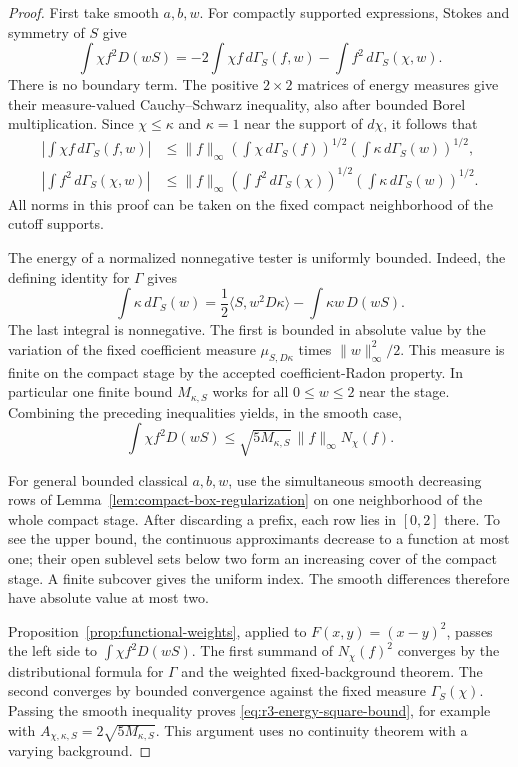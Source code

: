 \documentclass[11pt,a4paper]{article}
\numberwithin{equation}{section}
\theoremstyle{definition}
\theoremstyle{remark}
\begin{document}
\begin{proof}
First take smooth $a,b,w$. For compactly supported expressions,
Stokes and symmetry of $S$ give
\begin{equation}
\label{eq:r3-square-green}
 \int\chi f^2D(wS)
    =-2\int\chi f\,d\Gamma_S(f,w)
       -\int f^2\,d\Gamma_S(\chi,w).
\end{equation}
There is no boundary term. The positive $2\times2$ matrices of
energy measures give their measure-valued Cauchy--Schwarz
inequality, also after bounded Borel multiplication. Since
$\chi\leq\kappa$ and $\kappa=1$ near the support of
$d\chi$, it follows that
\begin{align*}
 \left|\int\chi f\,d\Gamma_S(f,w)\right|
   &\leq \|f\|_\infty
       \left(\int\chi\,d\Gamma_S(f)\right)^{1/2}
       \left(\int\kappa\,d\Gamma_S(w)\right)^{1/2},\\
 \left|\int f^2\,d\Gamma_S(\chi,w)\right|
   &\leq \|f\|_\infty
       \left(\int f^2\,d\Gamma_S(\chi)\right)^{1/2}
       \left(\int\kappa\,d\Gamma_S(w)\right)^{1/2}.
\end{align*}
All norms in this proof can be taken on the fixed compact
neighborhood of the cutoff supports.

The energy of a normalized nonnegative tester is uniformly bounded.
Indeed, the defining identity for $\Gamma$ gives
\[
 \int\kappa\,d\Gamma_S(w)
  =\frac12\langle S,w^2D\kappa\rangle
       -\int\kappa w\,D(wS).
\]
The last integral is nonnegative. The first is bounded in absolute
value by the variation of the fixed coefficient measure
$\mu_{S,D\kappa}$ times $\|w\|_\infty^2/2$.
This measure is finite on the compact stage by the accepted
coefficient-Radon property. In particular one finite bound
$M_{\kappa,S}$ works for all $0\leq w\leq2$ near the stage.
Combining the preceding inequalities yields, in the smooth case,
\[
 \int\chi f^2D(wS)
 \leq \sqrt{5M_{\kappa,S}}\,\|f\|_\infty N_\chi(f).
\]

For general bounded classical $a,b,w$, use the simultaneous smooth
decreasing rows of Lemma~\ref{lem:compact-box-regularization} on
one neighborhood of the whole compact stage. After discarding a
prefix, each row lies in $[0,2]$ there. To see the upper bound,
the continuous approximants decrease to a function at most one;
their open sublevel sets below two form an increasing cover of
the compact stage. A finite subcover gives the uniform index.
The smooth differences therefore have absolute value at most two.

Proposition~\ref{prop:functional-weights}, applied to
$F(x,y)=(x-y)^2$, passes the left side to
$\int\chi f^2D(wS)$. The first summand of
$N_\chi(f)^2$ converges by the distributional formula for
$\Gamma$ and the weighted fixed-background theorem. The second
converges by bounded convergence against the fixed measure
$\Gamma_S(\chi)$. Passing the smooth inequality proves
\eqref{eq:r3-energy-square-bound}, for example with
$A_{\chi,\kappa,S}=2\sqrt{5M_{\kappa,S}}$.
This argument uses no continuity theorem with a varying background.


\end{proof}
\end{document}
